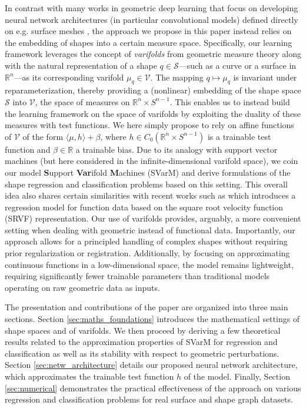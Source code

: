 \documentclass[11pt]{article}
\newcommand{\R}{\mathbb{R}}
\begin{document}
In contrast with many works in geometric deep learning that focus on developing neural network architectures (in particular convolutional models) defined directly on e.g. surface meshes \cite{kostrikov2018surface,jiang2019semi,hanocka2019meshcnn}, the approach we propose in this paper instead relies on the embedding of shapes into a certain measure space. Specifically, our learning framework leverages the concept of \textit{varifolds} from geometric measure theory \cite{Almgren66,Allard72} along with the natural representation of a shape $q \in \mathcal{S}$---such as a curve or a surface in $\R^n$---as its corresponding varifold $\mu_q \in \mathcal{V}$. The mapping $q\mapsto \mu_q$ is invariant under reparameterization, thereby providing a (nonlinear) embedding of the shape space $\mathcal{S}$ into $\mathcal{V}$, the space of measures on $\R^n \times S^{n-1}$. This enables us to instead build the learning framework on the space of varifolds by exploiting the duality of these measures with test functions. We here simply propose to rely on affine functions of $\mathcal{V}$ of the form $\langle \mu, h\rangle + \beta$, where $h \in C_0(\R^n \times S^{n-1})$ is a trainable test function and $\beta \in \R$ a trainable bias. Due to its analogy with support vector machines (but here considered in the infinite-dimensional varifold space), we coin our model \textbf{S}upport \textbf{Var}ifold \textbf{M}achines (SVarM) and derive formulations of the shape regression and classification problems based on this setting. This overall idea also shares certain similarities with recent works such as \cite{bhadra2025scalar} which introduces a regression model for function data based on the square root velocity function (SRVF) representation. Our use of varifolds provides, arguably, a more convenient setting when dealing with geometric instead of functional data. Importantly, our approach allows for a principled handling of complex shapes without requiring prior regularization or registration. Additionally, by focusing on approximating continuous functions in a low-dimensional space, the model remains lightweight, requiring significantly fewer trainable parameters than traditional models operating on raw geometric data as inputs.

The presentation and contributions of the paper are organized into three main sections. Section \ref{sec:maths_foundations} introduces the mathematical settings of shape spaces and of varifolds. We then proceed by deriving a few theoretical results related to the approximation properties of SVarM for regression and classification as well as its stability with respect to geometric perturbations. Section \ref{sec:netw_architecture} details our proposed neural network architecture, which approximates the trainable test function $h$ of the model. Finally, Section \ref{sec:numerical} demonstrates the practical effectiveness of the approach on various regression and classification problems for real surface and shape graph datasets. 
\end{document}
